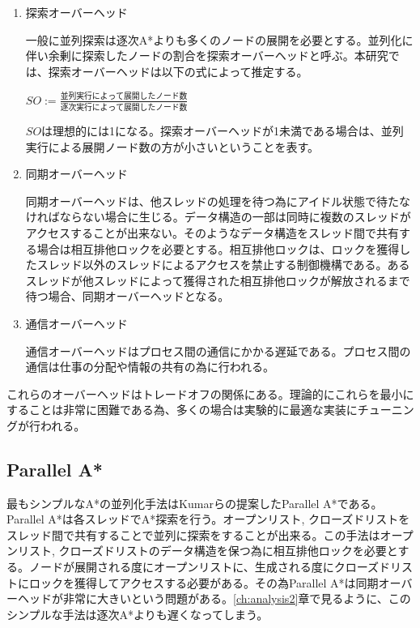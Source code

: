 \documentclass{jsarticle}
\begin{document}
\begin{enumerate}
\item 探索オーバーヘッド

一般に並列探索は逐次A*よりも多くのノードの展開を必要とする。並列化に伴い余剰に探索したノードの割合を探索オーバーヘッドと呼ぶ。本研究では、探索オーバーヘッドは以下の式によって推定する。

$SO := \frac{並列実行によって展開したノード数}{逐次実行によって展開したノード数}$

$SO$は理想的には1になる。探索オーバーヘッドが1未満である場合は、並列実行による展開ノード数の方が小さいということを表す。
\newline

\item 同期オーバーヘッド

同期オーバーヘッドは、他スレッドの処理を待つ為にアイドル状態で待たなければならない場合に生じる。データ構造の一部は同時に複数のスレッドがアクセスすることが出来ない。そのようなデータ構造をスレッド間で共有する場合は相互排他ロックを必要とする。相互排他ロックは、ロックを獲得したスレッド以外のスレッドによるアクセスを禁止する制御機構である。あるスレッドが他スレッドによって獲得された相互排他ロックが解放されるまで待つ場合、同期オーバーヘッドとなる。
\newline

\item 通信オーバーヘッド

通信オーバーヘッドはプロセス間の通信にかかる遅延である。プロセス間の通信は仕事の分配や情報の共有の為に行われる。

\end{enumerate}

これらのオーバーヘッドはトレードオフの関係にある。理論的にこれらを最小にすることは非常に困難である為、多くの場合は実験的に最適な実装にチューニングが行われる。


\subsection{Parallel A*}

最もシンプルなA*の並列化手法はKumarらの提案したParallel A*である\cite{kumar1988parallel}。Parallel A*は各スレッドでA*探索を行う。オープンリスト, クローズドリストをスレッド間で共有することで並列に探索をすることが出来る。この手法はオープンリスト, クローズドリストのデータ構造を保つ為に相互排他ロックを必要とする。ノードが展開される度にオープンリストに、生成される度にクローズドリストにロックを獲得してアクセスする必要がある。その為Parallel A*は同期オーバーヘッドが非常に大きいという問題がある。\ref{ch:analysis2}章で見るように、このシンプルな手法は逐次A*よりも遅くなってしまう。
\end{document}
